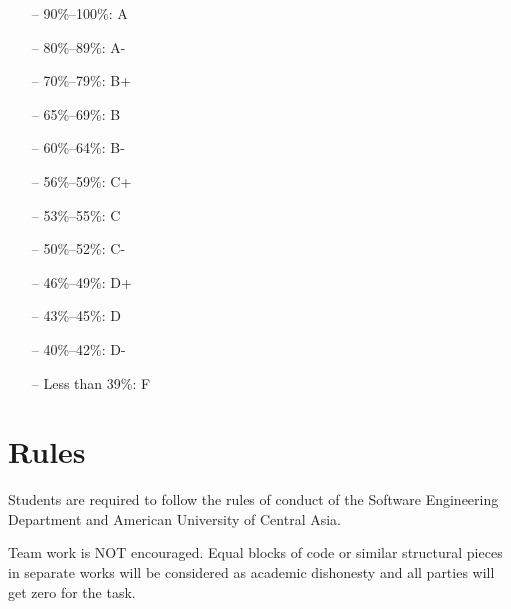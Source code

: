 \documentclass[12pt,a4paper,oneside]{article}
\begin{document}
        \begin{itemize} \itemsep-10pt \parskip0pt 
            \item[--] 90\%--100\%: A\\
            \item[--] 80\%--89\%: A-\\
            \item[--] 70\%--79\%: B+\\
            \item[--] 65\%--69\%: B\\
            \item[--] 60\%--64\%: B-\\
            \item[--] 56\%--59\%: C+\\
            \item[--] 53\%--55\%: C\\
            \item[--] 50\%--52\%: C-\\
            \item[--] 46\%--49\%: D+\\
            \item[--] 43\%--45\%: D\\
            \item[--] 40\%--42\%: D-\\
            \item[--] Less than 39\%: F
        \end{itemize}

    \section{Rules}

        Students are required to follow the rules of conduct of the Software
        Engineering Department and American University of Central Asia.

        Team work is NOT encouraged. Equal blocks of code or similar structural
        pieces in separate works will be considered as academic dishonesty and
        all parties will get zero for the task.
\end{document}
